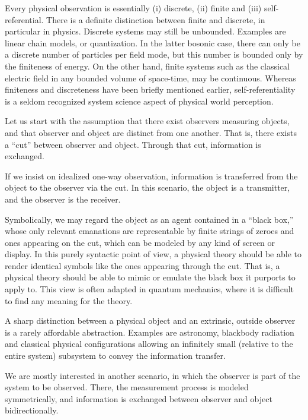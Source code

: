 \documentclass[rmp,amsfonts,showpacs,showkeys]{revtex4}
\begin{document}
Every physical observation is essentially (i) discrete, (ii) finite and (iii) self-referential.
There is a definite distinction between finite and discrete, in particular in physics.
Discrete systems may still be unbounded. Examples are linear chain models, or quantization.
In the latter bosonic case, there can only be a discrete number of particles per field mode,
but this number is bounded only by the finiteness of energy.
On the other hand, finite systems such as the classical electric field in any bounded volume
of space-time, may be continuous.
Whereas finiteness and discreteness have been briefly mentioned earlier,
self-referentiality is a seldom recognized system science aspect of physical world perception.

Let us start with the assumption that there exist observers measuring objects, and that
observer and object are distinct from one another.
That is, there exists a ``cut'' between observer and object.
Through that cut, information is exchanged.

If we insist on idealized one-way observation,
information is transferred from the object to the observer via the cut.
In this scenario, the object is a transmitter,
and the observer is the receiver.

Symbolically, we may regard the object as an agent contained in a ``black box,''
whose only relevant emanations are representable by finite strings of zeroes and ones
appearing on the cut, which can be modeled by any kind of screen or display.
In this purely syntactic point of view,
a physical theory should be able to render identical symbols like the ones appearing through the cut.
That is, a physical theory should be able to mimic or emulate the black box it purports to apply to.
This view is often adapted in quantum mechanics,
where it is difficult to find any meaning \cite{feynman-law} for the theory.


A sharp distinction between a physical object and an extrinsic,
outside observer is a rarely affordable abstraction.
Examples are astronomy, blackbody radiation and classical physical configurations
allowing an infinitely small (relative to the entire system) subsystem to convey the information transfer.

We are mostly interested in another scenario, in which the observer is part of the system to be observed.
There,
the measurement process is modeled symmetrically,
and information is exchanged between observer and object bidirectionally.
\end{document}
